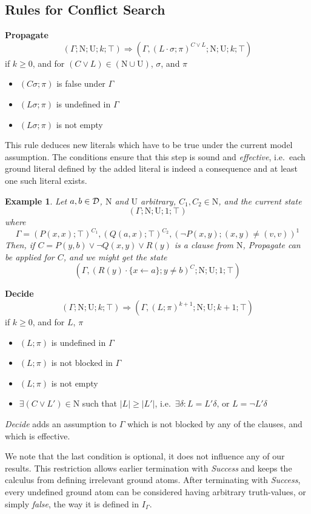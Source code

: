 \documentclass[a4paper]{article}
\newtheorem{example}[defi]{Example}
\begin{document}
\subsection{Rules for Conflict Search}
\textbf{Propagate}
\[(\Gamma; \text{N}; \text{U}; k; \top) \Rightarrow
    (\Gamma, (L\cdot\sigma;\pi)^{C \lor L}; \text{N}; \text{U}; k; \top)\]
if $k \geq 0$, and for $(C \lor L) \in (\text{N} \cup \text{U})$, $\sigma$, and $\pi$
\begin{itemize}
	\item $(C\sigma; \pi)$ is false under $\Gamma$
	\item $(L\sigma; \pi)$ is undefined in $\Gamma$
	\item $(L\sigma; \pi)$ is not empty
\end{itemize}
This rule deduces new literals which have to be true under the current model assumption.
The conditions ensure that this step is sound and \emph{effective}, i.e.\ 
each ground literal defined by the 
added literal is indeed a consequence and at least one such literal exists.

\begin{example}\label{exProp}
Let $a,b \in \mathcal{D}$, $\text{N}$ and $\text{U}$ arbitrary, $C_1, C_2 \in \text{N}$, and the current state
\[(\Gamma; \text{N}; \text{U}; 1; \top)\]
where
\[\Gamma = (P(x,x); \top)^{C_1}, (Q(a,x); \top)^{C_2}, (\neg P(x,y); (x,y) \ne (v,v))^1\]
Then, if $C = P(y,b) \lor \neg Q(x,y) \lor R(y)$ is a clause from $\text{N}$, \emph{Propagate} 
can be applied for $C$, and we might get the state
\[(\Gamma, (R(y)\cdot\{x \gets a\}; y \ne b)^C; \text{N}; \text{U}; 1; \top)\]
\end{example}
\textbf{Decide}
\[(\Gamma; \text{N}; \text{U}; k; \top) \Rightarrow
    (\Gamma, (L; \pi)^{k+1}; \text{N}; \text{U}; k+1; \top)\]
if $k \geq 0$, and for $L$, $\pi$
\begin{itemize}
	\item $(L; \pi)$ is undefined in $\Gamma$
	\item $(L; \pi)$ is not blocked in $\Gamma$
	\item $(L; \pi)$ is not empty
	\item $\exists (C \lor L') \in \text{N}$ such that $|L| \geq |L'|$, i.e.\ 
		$\exists \delta: L = L'\delta\text{, or }L = \neg L'\delta$
\end{itemize}
\emph{Decide} adds an assumption to $\Gamma$ which is not blocked by any of the clauses, and which 
is effective. 

We note that the last condition is optional, it does not influence any of our results.
This restriction allows earlier termination with \emph{Success} and keeps the calculus from defining irrelevant ground atoms. 
After terminating with \emph{Success}, every undefined ground atom can be considered having arbitrary truth-values, 
or simply \emph{false}, the way it is defined in $I_{\Gamma}$.
\end{document}
